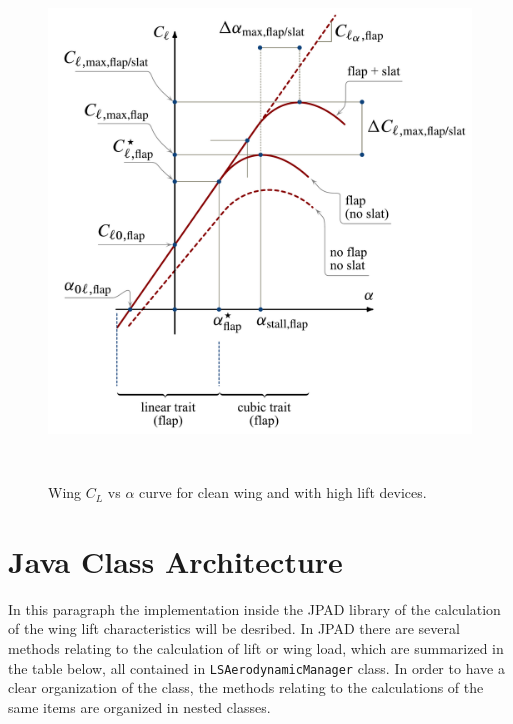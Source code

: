 \begin{figure}[H]
\centering
{\includegraphics[height=12.9cm]{Immagini/Airfoil_Cl_Vs_alpha_curve_flap_slat.pdf}} 
\caption{Wing $C_L$ vs $\alpha$ curve for clean wing and with high lift devices.}
\label{fig:clalfahl}
\end{figure}


\section{Java Class Architecture}

In this paragraph the implementation inside the JPAD library of the calculation of the wing lift characteristics will be desribed. In JPAD there are several methods relating to the calculation of lift or wing load, which are summarized in the table below, all contained in \texttt{LSAerodynamicManager} class. In order to have a clear organization of the class, the methods relating to the calculations of the same items are organized in nested classes.

